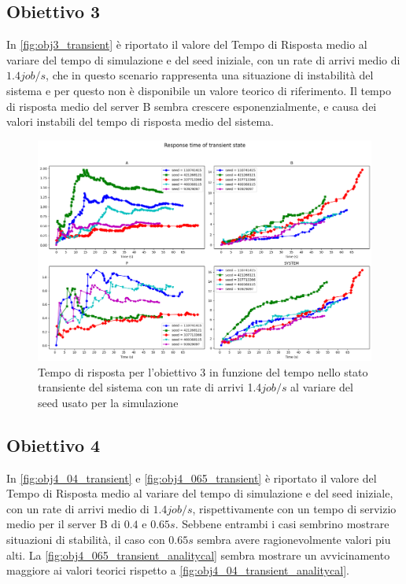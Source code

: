 \subsection{Obiettivo 3}

In \autoref{fig:obj3_transient} è riportato il valore del Tempo di Risposta medio al variare del tempo di simulazione e del seed iniziale, con un rate di arrivi medio di $1.4 job/s$, che in questo scenario rappresenta una situazione di instabilità del sistema e per questo non è disponibile un valore teorico di riferimento. Il tempo di risposta medio del server B sembra crescere esponenzialmente, e causa dei valori instabili del tempo di risposta medio del sistema. 

\begin{figure}
    \centering
    \includegraphics[width=\linewidth]{figs/appendices/transient/obj3-transient-rtime.png}
    \caption{Tempo di risposta per l'obiettivo 3 in funzione del tempo nello stato transiente del sistema con un rate di arrivi 1.4$job/s$ al variare del seed usato per la simulazione}
    \label{fig:obj3_transient}
\end{figure}

\subsection{Obiettivo 4}

In \autoref{fig:obj4_04_transient} e \autoref{fig:obj4_065_transient} è riportato il valore del Tempo di Risposta medio al variare del tempo di simulazione e del seed iniziale, con un rate di arrivi medio di $1.4 job/s$, rispettivamente con un tempo di servizio medio per il server B di $0.4$ e $0.65s$. Sebbene entrambi i casi sembrino mostrare situazioni di stabilità, il caso con $0.65s$ sembra avere ragionevolmente valori piu alti. La \autoref{fig:obj4_065_transient_analitycal} sembra mostrare un avvicinamento maggiore ai valori teorici rispetto a \autoref{fig:obj4_04_transient_analitycal}.

